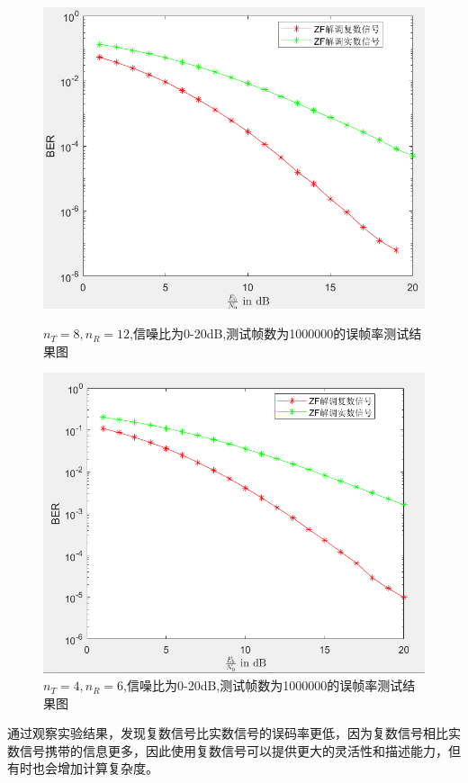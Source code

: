 \documentclass[a4paper,12pt]{article}
\begin{document}
	\begin{figure}[h]
		\centering
		\begin{minipage}{0.4\textwidth}
			\centering
			\includegraphics[width=\textwidth]{33.png}
			\caption{$n_T=8,n_R=12$,信噪比为0-20dB,测试帧数为1000000的误帧率测试结果图}
		\end{minipage}
		\qquad
		\begin{minipage}{0.4\textwidth}
			\centering
			\includegraphics[width=\textwidth]{32.png}
			\caption{$n_T=4,n_R=6$,信噪比为0-20dB,测试帧数为1000000的误帧率测试结果图}
		\end{minipage}
	\end{figure}
	通过观察实验结果，发现复数信号比实数信号的误码率更低，因为复数信号相比实数信号携带的信息更多，因此使用复数信号可以提供更大的灵活性和描述能力，但有时也会增加计算复杂度。
\end{document}
